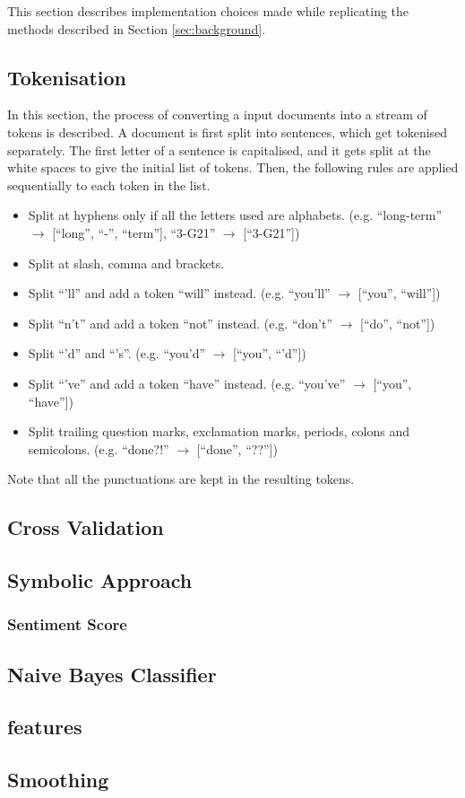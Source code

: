 This section describes implementation choices made while replicating the methods described in Section \ref{sec:background}.
\subsection{Tokenisation}
In this section, the process of converting a input documents into a stream of tokens is described.
A document is first split into sentences, which get tokenised separately.
The first letter of a sentence is capitalised, and it gets split at the white spaces to give the initial list of tokens.
Then, the following rules are applied sequentially to each token in the list.
\begin{itemize}
\item Split at hyphens only if all the letters used are alphabets.
(e.g. ``long-term'' $\rightarrow$ [``long'', ``-'', ``term''], ``3-G21'' $\rightarrow$ [``3-G21''])
\item Split at slash, comma and brackets.
\item Split ``'ll'' and add a token ``will'' instead.
(e.g. ``you'll'' $\rightarrow$ [``you'', ``will''])
\item Split ``n't'' and add a token ``not'' instead.
(e.g. ``don't'' $\rightarrow$ [``do'', ``not''])
\item Split ``'d'' and ``'s''.
(e.g. ``you'd'' $\rightarrow$ [``you'', ``'d''])
\item Split ``'ve'' and add a token ``have'' instead.
(e.g. ``you've'' $\rightarrow$ [``you'', ``have''])
\item Split trailing question marks, exclamation marks, periods, colons and semicolons.
(e.g. ``done?!'' $\rightarrow$ [``done'', ``??''])
\end{itemize}
Note that all the punctuations are kept in the resulting tokens.
\subsection{Cross Validation}

\subsection{Symbolic Approach}
\subsubsection{Sentiment Score}
\subsection{Naive Bayes Classifier}
\subsection{features}
\subsection{Smoothing}
